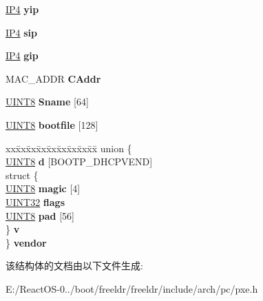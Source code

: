 \begin{DoxyCompactItemize}
\item 
\mbox{\label{structbootph_afeb6e05fa959647406c33047c4147776}} 
\hyperlink{union_i_p4}{I\+P4} {\bfseries yip}
\item 
\mbox{\label{structbootph_a8f72ddbbef437ee2b4fc8726a3c5319e}} 
\hyperlink{union_i_p4}{I\+P4} {\bfseries sip}
\item 
\mbox{\label{structbootph_a08b1ae4de7e0403585396cf2fab44cec}} 
\hyperlink{union_i_p4}{I\+P4} {\bfseries gip}
\item 
\mbox{\label{structbootph_a2554ead74f4b0f72364fd926a6b1126c}} 
M\+A\+C\+\_\+\+A\+D\+DR {\bfseries C\+Addr}
\item 
\mbox{\label{structbootph_a60d2feb77c620f1879d225e3b9223427}} 
\hyperlink{_processor_bind_8h_ab27e9918b538ce9d8ca692479b375b6a}{U\+I\+N\+T8} {\bfseries Sname} \mbox{[}64\mbox{]}
\item 
\mbox{\label{structbootph_af57d3eda8c4638cf0767a8f6fa874bb2}} 
\hyperlink{_processor_bind_8h_ab27e9918b538ce9d8ca692479b375b6a}{U\+I\+N\+T8} {\bfseries bootfile} \mbox{[}128\mbox{]}
\item 
\mbox{\label{structbootph_a438124d3c73cd7cc056a26d0697e50e1}} 
\begin{tabbing}
xx\=xx\=xx\=xx\=xx\=xx\=xx\=xx\=xx\=\kill
union \{\\
\>\hyperlink{_processor_bind_8h_ab27e9918b538ce9d8ca692479b375b6a}{UINT8} {\bfseries d} \mbox{[}BOOTP\_DHCPVEND\mbox{]}\\
\>struct \{\\
\>\>\hyperlink{_processor_bind_8h_ab27e9918b538ce9d8ca692479b375b6a}{UINT8} {\bfseries magic} \mbox{[}4\mbox{]}\\
\>\>\hyperlink{_processor_bind_8h_ae1e6edbbc26d6fbc71a90190d0266018}{UINT32} {\bfseries flags}\\
\>\>\hyperlink{_processor_bind_8h_ab27e9918b538ce9d8ca692479b375b6a}{UINT8} {\bfseries pad} \mbox{[}56\mbox{]}\\
\>\} {\bfseries v}\\
\} {\bfseries vendor}\\

\end{tabbing}\end{DoxyCompactItemize}


该结构体的文档由以下文件生成\+:\begin{DoxyCompactItemize}
\item 
E\+:/\+React\+O\+S-\/0../boot/freeldr/freeldr/include/arch/pc/pxe.\+h\end{DoxyCompactItemize}
